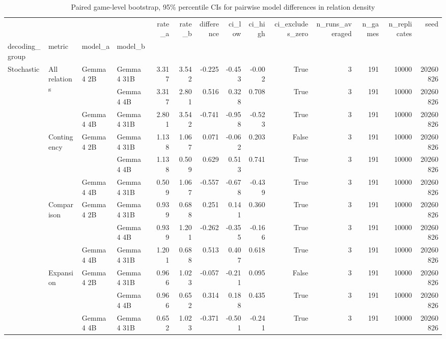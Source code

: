 \begin{table}
\caption{Paired game-level bootstrap, 95\% percentile CIs for pairwise model differences in relation density}
\begin{tabular}{llllrrrrrrrrrr}
\toprule
 &  &  &  & rate\_a & rate\_b & difference & ci\_low & ci\_high & ci\_excludes\_zero & n\_runs\_averaged & n\_games & n\_replicates & seed \\
decoding_group & metric & model_a & model_b &  &  &  &  &  &  &  &  &  &  \\
\midrule
\multirow[t]{15}{*}{Stochastic} & \multirow[t]{3}{*}{All relations} & \multirow[t]{2}{*}{Gemma 4 2B} & Gemma 4 31B & 3.317 & 3.542 & -0.225 & -0.453 & -0.002 & True & 3 & 191 & 10000 & 20260826 \\
 &  &  & Gemma 4 4B & 3.317 & 2.801 & 0.516 & 0.328 & 0.708 & True & 3 & 191 & 10000 & 20260826 \\
\cline{3-14}
 &  & Gemma 4 4B & Gemma 4 31B & 2.801 & 3.542 & -0.741 & -0.958 & -0.523 & True & 3 & 191 & 10000 & 20260826 \\
\cline{2-14} \cline{3-14}
 & \multirow[t]{3}{*}{Contingency} & \multirow[t]{2}{*}{Gemma 4 2B} & Gemma 4 31B & 1.138 & 1.067 & 0.071 & -0.062 & 0.203 & False & 3 & 191 & 10000 & 20260826 \\
 &  &  & Gemma 4 4B & 1.138 & 0.509 & 0.629 & 0.513 & 0.741 & True & 3 & 191 & 10000 & 20260826 \\
\cline{3-14}
 &  & Gemma 4 4B & Gemma 4 31B & 0.509 & 1.067 & -0.557 & -0.678 & -0.439 & True & 3 & 191 & 10000 & 20260826 \\
\cline{2-14} \cline{3-14}
 & \multirow[t]{3}{*}{Comparison} & \multirow[t]{2}{*}{Gemma 4 2B} & Gemma 4 31B & 0.939 & 0.688 & 0.251 & 0.141 & 0.360 & True & 3 & 191 & 10000 & 20260826 \\
 &  &  & Gemma 4 4B & 0.939 & 1.201 & -0.262 & -0.355 & -0.166 & True & 3 & 191 & 10000 & 20260826 \\
\cline{3-14}
 &  & Gemma 4 4B & Gemma 4 31B & 1.201 & 0.688 & 0.513 & 0.407 & 0.618 & True & 3 & 191 & 10000 & 20260826 \\
\cline{2-14} \cline{3-14}
 & \multirow[t]{3}{*}{Expansion} & \multirow[t]{2}{*}{Gemma 4 2B} & Gemma 4 31B & 0.966 & 1.023 & -0.057 & -0.211 & 0.095 & False & 3 & 191 & 10000 & 20260826 \\
 &  &  & Gemma 4 4B & 0.966 & 0.652 & 0.314 & 0.188 & 0.435 & True & 3 & 191 & 10000 & 20260826 \\
\cline{3-14}
 &  & Gemma 4 4B & Gemma 4 31B & 0.652 & 1.023 & -0.371 & -0.501 & -0.241 & True & 3 & 191 & 10000 & 20260826 \\

\end{tabular}
\end{table}
